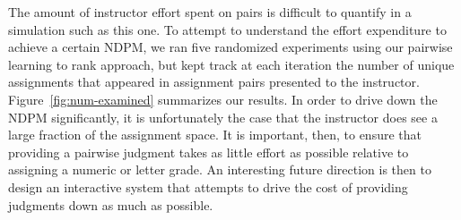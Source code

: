 The amount of instructor effort spent on pairs is difficult to quantify in
a simulation such as this one. To attempt to understand the effort
expenditure to achieve a certain NDPM, we ran five randomized experiments
using our pairwise learning to rank approach, but kept track at each
iteration the number of unique assignments that appeared in assignment
pairs presented to the instructor.  Figure~\ref{fig:num-examined}
summarizes our results. In order to drive down the NDPM significantly, it
is unfortunately the case that the instructor does see a large fraction of
the assignment space. It is important, then, to ensure that providing a
pairwise judgment takes as little effort as possible relative to assigning
a numeric or letter grade.  An interesting future direction is then to
design an interactive system that attempts to drive the cost of providing
judgments down as much as possible.

%
%
%
%
%
%
